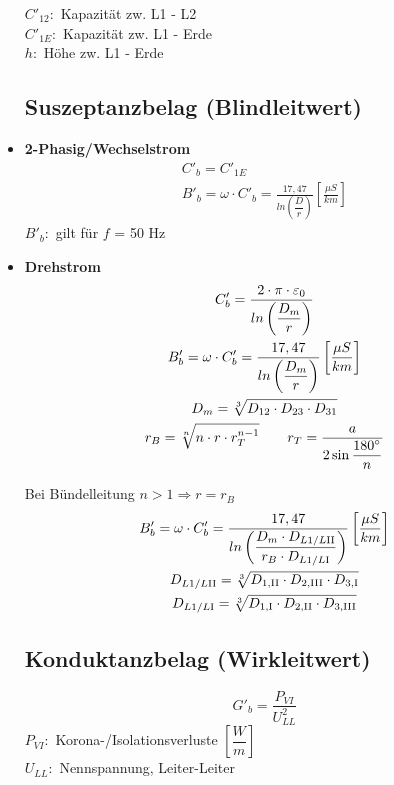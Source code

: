 \begin{itemize}
$C'_{12}:$ Kapazität zw. L1 - L2\\
$C'_{1E}:$ Kapazität zw. L1 - Erde\\
$h:$ Höhe zw. L1 - Erde

\subsection{Suszeptanzbelag (Blindleitwert)}
    \item[]{\textbf{2-Phasig/Wechselstrom}}
    \begin{gather*}
        C'_b = C'_{1E}\\
        B'_b = \omega \cdot C'_b = \frac{17,47}{ln\left(\dfrac{D}{r} \right)} \left[ \frac{\mu S}{km} \right]
    \end{gather*}
    $B'_b:$ gilt für $f$ = 50 Hz\\

\item[]{\textbf{Drehstrom}}
    \begin{gather*}
        C'_b = \frac{2\cdot \pi \cdot \varepsilon_0}{ln \left( \dfrac{D_m}{r} \right)} \\
        B'_b = \omega \cdot C'_b = \frac{17,47}{ln\left(\dfrac{D_m}{r} \right)} \left[ \frac{\mu S}{km} \right]\\
        D_{m} = \sqrt[3]{D_{12} \cdot D_{23} \cdot D_{31}}\\
        r_B = \sqrt[n]{n \cdot r \cdot r_{T}^{n-1}} \qquad
        r_T = \frac{a}{2 \sin \dfrac{180 \degree}{n}}
    \end{gather*}

    Bei Bündelleitung $n>1 \Rightarrow r = r_B$\\

    \begin{gather*}
        B'_b = \omega \cdot C'_b = \frac{17,47}{ln\left(\dfrac{D_m \cdot D_{L1/L\RN{2}}}{r_B \cdot D_{L1/L \RN{1}}} \right)} \left[ \frac{\mu S}{km} \right]\\
        D_{L1/L\RN{2}} = \sqrt[3]{D_{1,\RN{2}} \cdot D_{2,\RN{3}} \cdot D_{3,\RN{1}}}\\
        D_{L1/L\RN{1}} = \sqrt[3]{D_{1,\RN{1}} \cdot D_{2,\RN{2}} \cdot D_{3,\RN{3}}}\\
    \end{gather*}

\subsection{Konduktanzbelag (Wirkleitwert)}
\begin{equation*}
    G'_b = \dfrac{P_{\mathit{VI}}}{U^2_{\mathit{LL}}}
\end{equation*}
$P_{\mathit{VI}}:$ Korona-/Isolationsverluste $\left[\dfrac{W}{m} \right]$\\
$U_{\mathit{LL}}:$ Nennspannung, Leiter-Leiter
\end{itemize}
